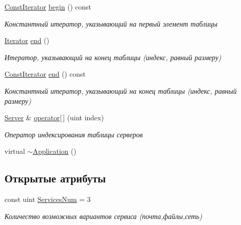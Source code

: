 \begin{DoxyCompactItemize}
\hyperlink{class_network_service_1_1_application_a51fff3b7cce6bf84c2edbd887c0cac45}{Const\+Iterator} \hyperlink{class_network_service_1_1_application_a2d3762c2bc3f66e96b1295ec584f779d}{begin} () const 
\begin{DoxyCompactList}\small\item\em Константный итератор, указывающий на первый элемент таблицы \end{DoxyCompactList}\item 
\hyperlink{class_network_service_1_1_application_a206937019d86d3391a209e9883b44f7b}{Iterator} \hyperlink{class_network_service_1_1_application_ab0fcfd1baa6f19b018ad6e8ab7ca122c}{end} ()
\begin{DoxyCompactList}\small\item\em Итератор, указывающий на конец таблицы (индекс, равный размеру) \end{DoxyCompactList}\item 
\hyperlink{class_network_service_1_1_application_a51fff3b7cce6bf84c2edbd887c0cac45}{Const\+Iterator} \hyperlink{class_network_service_1_1_application_ae464b274be530d8d8a546488780a077e}{end} () const 
\begin{DoxyCompactList}\small\item\em Константный итератор, указывающий на конец таблицы (индекс, равный размеру) \end{DoxyCompactList}\item 
\hyperlink{class_network_service_1_1_server}{Server} \& \hyperlink{class_network_service_1_1_application_a6dba76630cbd2d6863d2331475a18518}{operator\mbox{[}$\,$\mbox{]}} (uint index)
\begin{DoxyCompactList}\small\item\em Оператор индексирования таблицы серверов \end{DoxyCompactList}\item 
virtual \hyperlink{class_network_service_1_1_application_a5f806355ef363880214dc158c24951d6}{$\sim$\+Application} ()
\end{DoxyCompactItemize}
\subsection*{Открытые атрибуты}
\begin{DoxyCompactItemize}
\item 
const uint \hyperlink{class_network_service_1_1_application_a95664d256ae9f339502b82b462d46365}{Services\+Num} = 3
\begin{DoxyCompactList}\small\item\em Количество возможных вариантов сервиса (почта,файлы,сеть) \end{DoxyCompactList}\end{DoxyCompactItemize}
